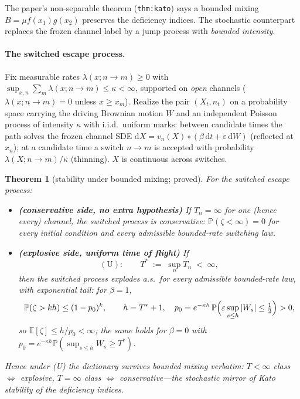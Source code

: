 \documentclass[11pt]{article}
\newtheorem{theorem}{Theorem}
\theoremstyle{remark}
\newcommand{\dd}{\mathrm{d}}
\newcommand{\E}{\mathbb{E}}
\newcommand{\Prob}{\mathbb{P}}
\begin{document}
The paper's non-separable theorem (\texttt{thm:kato}) says a bounded
mixing $B=\mu f(x_{1})g(x_{2})$ preserves the deficiency indices.  The
stochastic counterpart replaces the frozen channel label by a jump
process with \emph{bounded intensity}.

\paragraph{The switched escape process.}  Fix measurable rates
$\lambda(x;n\to m)\ge0$ with
$\sup_{x,n}\sum_{m}\lambda(x;n\to m)\le\kappa<\infty$, supported on
\emph{open} channels ($\lambda(x;n\to m)=0$ unless $x\ge x_{m}$).
Realize the pair $(X_{t},n_{t})$ on a probability space carrying the
driving Brownian motion $W$ and an independent Poisson process of
intensity $\kappa$ with i.i.d.\ uniform marks: between candidate times
the path solves the frozen channel SDE
$\dd X=v_{n}(X)\circ(\beta\,\dd t+\varepsilon\,\dd W)$ (reflected at
$x_{n}$); at a candidate time a switch $n\to m$ is accepted with
probability $\lambda(X;n\to m)/\kappa$ (thinning).  $X$ is continuous
across switches.

\begin{theorem}[stability under bounded mixing; proved]\label{thm:B}
For the switched escape process:
\begin{itemize}
\item[(a)] \textbf{(conservative side, no extra hypothesis)}  If
$T_{n}=\infty$ for one (hence every) channel, the switched process is
conservative: $\Prob(\zeta<\infty)=0$ for every initial condition and
\emph{every} admissible bounded-rate switching law.
\item[(b)] \textbf{(explosive side, uniform time of flight)}  If
\[
(\mathrm U):\qquad T^{*}\;:=\;\sup_{n}T_{n}\;<\;\infty ,
\]
then the switched process explodes a.s.\ for every admissible
bounded-rate law, with exponential tail: for $\beta=1$,
\[
\Prob(\zeta>kh)\le(1-p_{0})^{k},\qquad
h=T^{*}+1,\quad
p_{0}=e^{-\kappa h}\,
\Prob\Bigl(\varepsilon\sup_{s\le h}|W_{s}|\le\tfrac12\Bigr)>0,
\]
so $\E[\zeta]\le h/p_{0}<\infty$; the same holds for $\beta=0$ with
$p_{0}=e^{-\kappa h}\Prob(\sup_{s\le h}W_{s}\ge T^{*})$.
\end{itemize}
Hence under (U) the dictionary survives bounded mixing verbatim:
$T<\infty$ class $\Leftrightarrow$ explosive, $T=\infty$ class
$\Leftrightarrow$ conservative---the stochastic mirror of Kato
stability of the deficiency indices.
\end{theorem}
\end{document}

